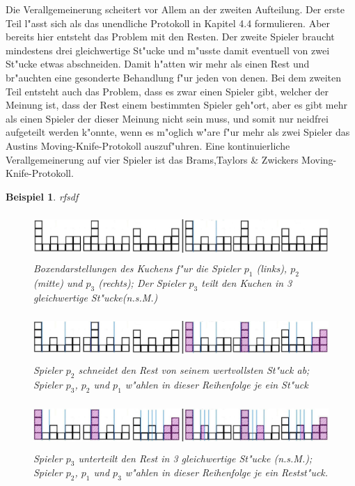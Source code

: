 \documentclass[11pt, a4paper, twoside]{article}
\newcommand{\rf}{\color{red}}
\newcommand{\wf}{\color{white}}
\newcommand{\tf}{\color{black}}
\newtheorem{bsp}[satz]{Beispiel}
\numberwithin{equation}{section}
\begin{document}
Die Verallgemeinerung scheitert vor Allem an der zweiten Aufteilung. Der erste Teil l"asst sich als das unendliche Protokoll in Kapitel 4.4 formulieren. Aber bereits hier entsteht das Problem mit den Resten. Der zweite Spieler braucht mindestens drei gleichwertige St"ucke und m"usste damit eventuell von zwei St"ucke etwas abschneiden. Damit h"atten wir mehr als einen Rest und br"auchten eine gesonderte Behandlung f"ur jeden von denen. Bei dem zweiten Teil entsteht auch das Problem, dass es zwar einen Spieler gibt, welcher der Meinung ist, dass der Rest einem bestimmten Spieler geh"ort, aber es gibt mehr als einen Spieler der dieser Meinung nicht sein muss, und somit nur neidfrei aufgeteilt werden k"onnte, wenn es m"oglich w"are f"ur mehr als \rf zwei Spieler das Austins Moving-Knife-Protokoll \tf auszuf"uhren. Eine kontinuierliche Verallgemeinerung auf vier Spieler ist das Brams,Taylors \& Zwickers Moving-Knife-Protokoll. 
\begin{bsp}\wf rfsdf
\begin{figure}[h!]
\includegraphics[height=1.73cm]{scc.jpg}
\caption[Beispiel zum Selfridge-Conway-Protokoll 1/3]{Boxendarstellungen des Kuchens f"ur die Spieler $p_1$ (links), $p_2$ (mitte) und $p_3$ (rechts); Der Spieler $p_3$ teilt den Kuchen in 3 gleichwertige St"ucke(n.s.M.)}
\end{figure}
\begin{figure}[h!]
\includegraphics[height=1.75cm]{scc2.jpg}
\caption[Beispiel zum Selfridge-Conway-Protokoll 2/3]{Spieler $p_2$ schneidet den Rest von seinem wertvollsten St"uck ab; Spieler $p_3$, $p_2$ und $p_1$ w"ahlen in dieser Reihenfolge je ein St"uck}
\end{figure}
\begin{figure}[h!]
\includegraphics[height=1.75cm]{scc4.jpg}
\caption[Beispiel zum Selfridge-Conway-Protokoll 3/3]{Spieler $p_3$ unterteilt den Rest in 3 gleichwertige St"ucke (n.s.M.); Spieler $p_2$, $p_1$ und $p_3$ w"ahlen in dieser Reihenfolge je ein Restst"uck.}
\end{figure}
\end{bsp}
\end{document}
